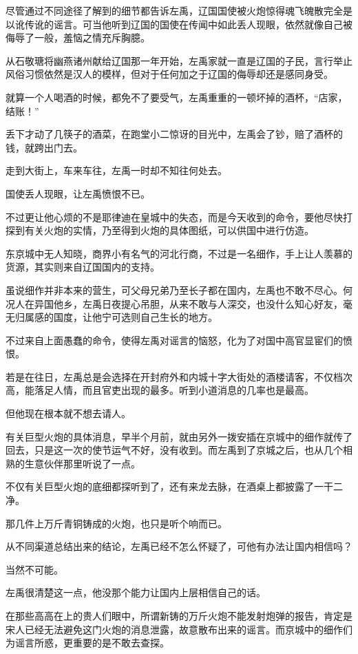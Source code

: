 尽管通过不同途径了解到的细节都告诉左禹，辽国国使被火炮惊得魂飞魄散完全是以讹传讹的谣言。可当他听到辽国的国使在传闻中如此丢人现眼，依然就像自己被侮辱了一般，羞恼之情充斥胸臆。

从石敬瑭将幽燕诸州献给辽国那一年开始，左禹家就一直是辽国的子民，言行举止风俗习惯依然是汉人的模样，但对于任何加之于辽国的侮辱却还是感同身受。

就算一个人喝酒的时候，都免不了要受气，左禹重重的一顿坏掉的酒杯，“店家，结账！”

丢下才动了几筷子的酒菜，在跑堂小二惊讶的目光中，左禹会了钞，赔了酒杯的钱，就跨出门去。

走到大街上，车来车往，左禹一时却不知往何处去。

国使丢人现眼，让左禹愤恨不已。

不过更让他心烦的不是耶律迪在皇城中的失态，而是今天收到的命令，要他尽快打探到有关火炮的实情，乃至得到火炮的具体图纸，可以供国中进行仿造。

东京城中无人知晓，商界小有名气的河北行商，不过是一名细作，手上让人羡慕的货源，其实则来自辽国国内的支持。

虽说细作并非本来的营生，可父母兄弟乃至长子都在国内，左禹也不敢不尽心。何况人在异国他乡，左禹日夜提心吊胆，从来不敢与人深交，也没什么知心好友，毫无归属感的国度，让他宁可选则自己生长的地方。

不过来自上面愚蠢的命令，使得左禹对谣言的恼怒，化为了对国中高官显宦们的愤恨。

若是在往日，左禹总是会选择在开封府外和内城十字大街处的酒楼请客，不仅档次高，能落足人情，而且官吏出现的最多。听到小道消息的几率也是最高。

但他现在根本就不想去请人。

有关巨型火炮的具体消息，早半个月前，就由另外一拨安插在京城中的细作就传了回去，只是这一次的使节运气不好，没有收到。而左禹到了京城之后，也从几个相熟的生意伙伴那里听说了一点。

不仅有关巨型火炮的底细都探听到了，还有来龙去脉，在酒桌上都披露了一干二净。

那几件上万斤青铜铸成的火炮，也只是听个响而已。

从不同渠道总结出来的结论，左禹已经不怎么怀疑了，可他有办法让国内相信吗？

当然不可能。

左禹很清楚这一点，他没那个能力让国内上层相信自己的话。

在那些高高在上的贵人们眼中，所谓新铸的万斤火炮不能发射炮弹的报告，肯定是宋人已经无法避免这门火炮的消息泄露，故意散布出来的谣言。而京城中的细作们为谣言所惑，更重要的是不敢去查探。

